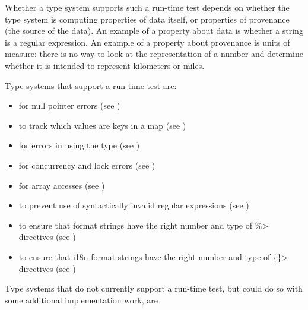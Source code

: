 Whether a type system supports such a run-time test depends on whether the
type system is computing properties of data itself, or properties of
provenance (the source of the data).  An example of a property about data is
whether a string is a regular expression.  An example of a property about
provenance is units of measure:  there is no way to look at the
representation of a number and determine whether it is intended to
represent kilometers or miles.


Type systems that support a run-time test are:
\begin{itemize}
\item
   for null pointer errors
  (see )
\item
   to track which values are
  keys in a map (see )
\item
   for errors in using the
   type (see
  )
\item
   for concurrency and lock errors
  (see )
\item
   for array accesses
  (see )
\item
   to prevent use of syntactically
  invalid regular expressions (see )
\item
   to ensure that format
  strings have the right number and type of \<\%> directives (see
  )
\item
  to ensure that i18n format strings have the right number and type of
  \<\{\}> directives (see )
\end{itemize}


Type systems that do not currently support a run-time test, but could do so with some
additional implementation work, are

